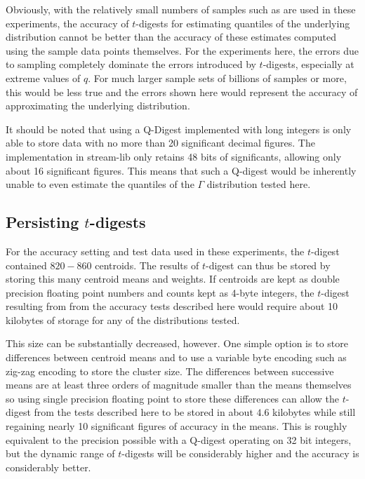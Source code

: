 \documentclass[11pt]{amsart}
\begin{document}
Obviously, with the relatively small numbers of samples such as are used in these experiments, the accuracy of $t$-digests for estimating quantiles of the underlying distribution cannot be better than the accuracy of these estimates computed using the sample data points themselves.  For the experiments here, the errors due to sampling completely dominate the errors introduced by $t$-digests, especially at extreme values of $q$.  For much larger sample sets of billions of samples or more, this would be less true and the errors shown here would represent the accuracy of approximating the underlying distribution.

It should be noted that using a Q-Digest implemented with long integers is only able to store data with no more than 20 significant decimal figures.  The implementation in stream-lib only retains 48 bits of significants, allowing only about 16 significant figures.  This means that such a Q-digest would be inherently unable to even estimate the quantiles of the $\Gamma$ distribution tested here.

\subsection{Persisting $t$-digests}
For the accuracy setting and test data used in these experiments, the $t$-digest contained $820-860$ centroids.  The results of $t$-digest can thus be stored by storing this many centroid means and weights.  If centroids are kept as double precision floating point numbers and counts kept as 4-byte integers, the $t$-digest resulting from from the accuracy tests described here would require about 10 kilobytes of storage for any of the distributions tested.

This size can be substantially decreased, however.  One simple option is to store differences between centroid means and to use a variable byte encoding such as zig-zag encoding to store the cluster size.  The differences between successive means are at least three orders of magnitude smaller than the means themselves so using single precision floating point to store these differences can allow the $t$-digest from the tests described here to be stored in about $4.6$ kilobytes while still regaining nearly 10 significant figures of accuracy in the means.  This is roughly equivalent to the precision possible with a Q-digest operating on 32 bit integers, but the dynamic range of $t$-digests will be considerably higher and the accuracy is considerably better.
\end{document}
